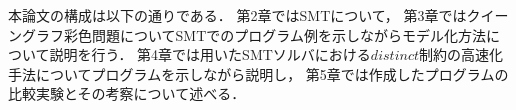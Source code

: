 %
%
%
%
%


本論文の構成は以下の通りである．
第2章ではSMTについて，
第3章ではクイーングラフ彩色問題についてSMTでのプログラム例を示しながらモデル化方法について説明を行う．
第4章では用いたSMTソルバにおける$distinct$制約の高速化手法についてプログラムを示しながら説明し，
第5章では作成したプログラムの比較実験とその考察について述べる．

